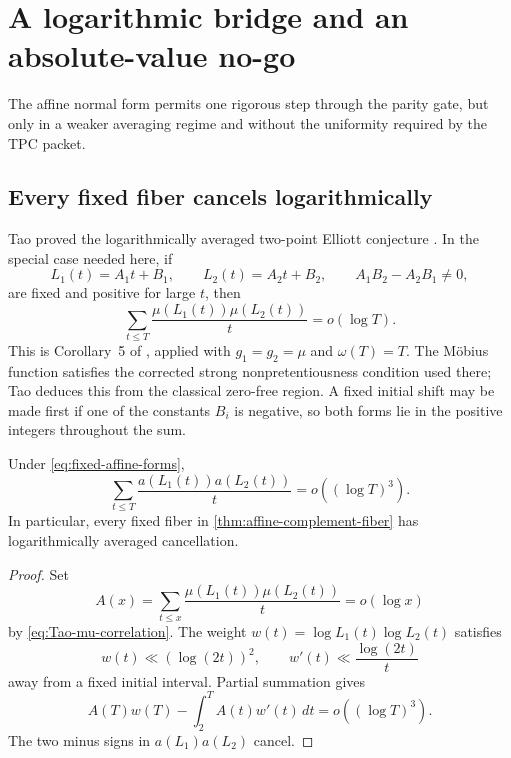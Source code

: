 \section{A logarithmic bridge and an absolute-value no-go}
\label{sec:logarithmic-bridge}

The affine normal form permits one rigorous step through the parity
gate, but only in a weaker averaging regime and without the uniformity
required by the TPC packet.

\subsection{Every fixed fiber cancels logarithmically}

Tao proved the logarithmically averaged two-point Elliott conjecture
\citep{Tao2016}.  In the special case needed here, if
\begin{equation}
 L_1(t)=A_1t+B_1,\qquad L_2(t)=A_2t+B_2,
 \qquad A_1B_2-A_2B_1\ne0,
 \label{eq:fixed-affine-forms}
\end{equation}
are fixed and positive for large \(t\), then
\begin{equation}
 \sum_{t\le T}\frac{\mu(L_1(t))\mu(L_2(t))}{t}
 =o(\log T).
 \label{eq:Tao-mu-correlation}
\end{equation}
This is Corollary~5 of \citet{Tao2016}, applied with
\(g_1=g_2=\mu\) and \(\omega(T)=T\).  The M\"obius function satisfies
the corrected strong nonpretentiousness condition used there; Tao
deduces this from the classical zero-free region.  A fixed initial
shift may be made first if one of the constants \(B_i\) is negative,
so both forms lie in the positive integers throughout the sum.

\begin{proposition}
\label{prop:fixed-fiber-log}
Under \eqref{eq:fixed-affine-forms},
\begin{equation}
 \boxed{
 \sum_{t\le T}\frac{a(L_1(t))a(L_2(t))}{t}
 =o((\log T)^3).}
 \label{eq:fixed-fiber-log}
\end{equation}
In particular, every fixed fiber in
\cref{thm:affine-complement-fiber} has logarithmically averaged
cancellation.
\end{proposition}

\begin{proof}
Set
\[
 A(x)=\sum_{t\le x}\frac{\mu(L_1(t))\mu(L_2(t))}{t}
 =o(\log x)
\]
by \eqref{eq:Tao-mu-correlation}.  The weight
\(w(t)=\log L_1(t)\log L_2(t)\) satisfies
\[
 w(t)\ll(\log(2t))^2,
 \qquad w'(t)\ll\frac{\log(2t)}t
\]
away from a fixed initial interval.  Partial summation gives
\[
 A(T)w(T)-\int_2^T A(t)w'(t)\,dt=o((\log T)^3).
\]
The two minus signs in \(a(L_1)a(L_2)\) cancel.
\end{proof}

